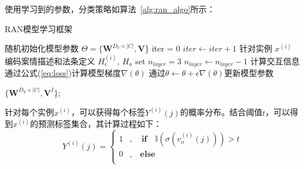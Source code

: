使用学习到的参数，分类策略如算法~\ref{alg:ran_algo}所示：
\begin{algorithm}[htb]
    \caption{RAN模型学习框架}
    \label{alg:ran_algo}
    \begin{algorithmic}[1]
    \State 随机初始化模型参数 $\Theta=\{\textbf{W}^{D_V\times |C|},\textbf{V}$\}
    \label{code:fram:ran initialize parameters}
    \State iter = 0
    \label{code:fram:ran begin}
    \Repeat
    \label{code:fram:ran repeat}
        \State $iter \leftarrow iter+1$
        \label{code:fram:ran re_value}
        \label{code:fram:ran for1}
            \State 针对实例 $x^{(i)}$
            \label{code:fram:ran task_join1}
            \State 编码案情描述和法条定义 $H_e^{(i)}$, $H_a$
            \label{code:fram:ran encode}
            \State set $n_{layer} = 3$
            \label{code:fram:ran recurrent_layer}
            \Repeat
            \label{code:fram:ran repeat_recurrent}
                \State $n_{layer} \leftarrow n_{layer} - 1$ 
                \label{code:fram:ran iter_layer}
                \State 计算交互信息
                \label{code:fram:ran compute_iteraction}
            \State  通过公式(\ref{eq:loss})计算模型梯度$\nabla(\theta)$
            \label{code:fram:ran com_grad}
            \State 通过$\theta \leftarrow \theta + \epsilon \nabla(\theta)$更新模型参数
            \label{code:fram:ran update_grad}
        \EndFor
        
    \State
    \Return $\{\textbf{W}^{D_V\times |C|},\textbf{V}^I\}$;
    \end{algorithmic}
\end{algorithm}

针对每个实例$x^{(i)}$，可以获得每个标签$Y^{(i)}(j)$的概率分布。结合阈值$t$，可以得到$x^{(i)}$的预测标签集合，其计算过程如下：
\begin{displaymath}
    Y^{(i)}(j)=\left\{
    \begin{aligned}
    1 &, \quad \textbf{if} \quad \mathbb{I}(\sigma(v_{o}^{(i)}(j))) > t \\
    0 &, \quad \textbf{else} \\
    \end{aligned}
    \right.
\end{displaymath}

